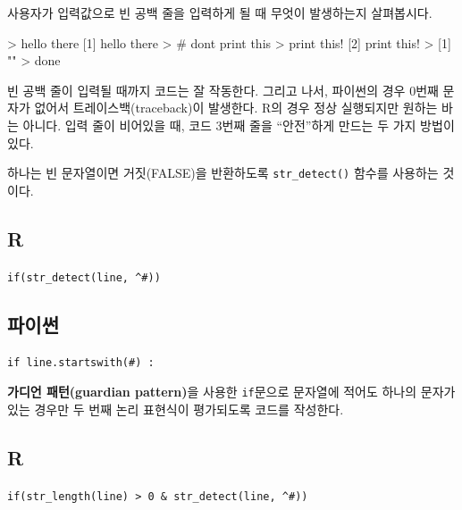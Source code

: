 \documentclass[
  letterpaper,
]{book}
\newenvironment{Shaded}{\begin{snugshade}}{\end{snugshade}}
\newcommand{\CommentTok}[1]{\textcolor[rgb]{0.37,0.37,0.37}{#1}}
\newcommand{\ExtensionTok}[1]{\textcolor[rgb]{0.00,0.23,0.31}{#1}}
\newcommand{\NormalTok}[1]{\textcolor[rgb]{0.00,0.23,0.31}{#1}}
\newcommand{\OperatorTok}[1]{\textcolor[rgb]{0.37,0.37,0.37}{#1}}
\newcommand{\StringTok}[1]{\textcolor[rgb]{0.13,0.47,0.30}{#1}}
\begin{document}
사용자가 입력값으로 빈 공백 줄을 입력하게 될 때 무엇이 발생하는지
살펴봅시다.

\begin{Shaded}
\begin{Highlighting}[]
\OperatorTok{\textgreater{}}\NormalTok{ hello }\ExtensionTok{there}
\ExtensionTok{[1]}\NormalTok{ hello there}
\OperatorTok{\textgreater{}} \CommentTok{\# don\textquotesingle{}t print this}
\OperatorTok{\textgreater{}}\NormalTok{ print }\ExtensionTok{this!}
\ExtensionTok{[2]}\NormalTok{ print this!}
\OperatorTok{\textgreater{}} 
\ExtensionTok{[1]} \StringTok{""}
\OperatorTok{\textgreater{}}\NormalTok{ done}
\end{Highlighting}
\end{Shaded}

빈 공백 줄이 입력될 때까지 코드는 잘 작동한다. 그리고 나서, 파이썬의
경우 0번째 문자가 없어서 트레이스백(traceback)이 발생한다. R의 경우 정상
실행되지만 원하는 바는 아니다. 입력 줄이 비어있을 때, 코드 3번째 줄을
``안전''하게 만드는 두 가지 방법이 있다.

하나는 빈 문자열이면 거짓(FALSE)을 반환하도록 \texttt{str\_detect()}
함수를 사용하는 것이다.

\subsection*{R}\label{r-27}

\texttt{if(str\_detect(line,\ \textquotesingle{}\^{}\#\textquotesingle{}))}

\subsection*{파이썬}\label{uxd30cuxc774uxc36c-27}

\texttt{if\ line.startswith(\textquotesingle{}\#\textquotesingle{})\ :}

\textbf{가디언 패턴(guardian pattern)}을 사용한 \texttt{if}문으로
문자열에 적어도 하나의 문자가 있는 경우만 두 번째 논리 표현식이
평가되도록 코드를 작성한다.  

\subsection*{R}\label{r-28}

\texttt{if(str\_length(line)\ \textgreater{}\ 0\ \&\ str\_detect(line,\ \textquotesingle{}\^{}\#\textquotesingle{}))}
\end{document}
